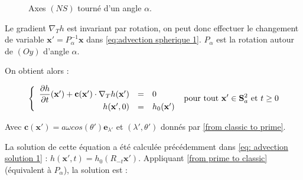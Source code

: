 \begin{figure}[ht]
\begin{center}
\end{center}
\caption{Axes $(NS)$ tourné d'un angle $\alpha$.}
\label{fig:rot alpha sphere}
\end{figure}





Le gradient $\nabla_T h$ est invariant par rotation, on peut donc effectuer le changement de variable $\mathbf{x}' = P_{\alpha}^{-1} \mathbf{x}$ dans \eqref{eq:advection spherique 1}. $P_{\alpha}$ est la rotation autour de $(Oy)$ d'angle $\alpha$.

On obtient alors :

\begin{equation}
\left\lbrace
\begin{array}{r cl}
\dfrac{\partial h}{\partial t}( \mathbf{x}' ) + \mathbf{c} ( \mathbf{x}' ) \cdot \nabla_ T h( \mathbf{x}' ) & = & 0 \\
h(\mathbf{x}',0) & = & h_0 ( \mathbf{x}' )
\end{array}
\right. \text{ pour tout } \mathbf{x}' \in \mathbf{S}_a^2 \text{ et } t \geq 0
\end{equation}

Avec $\mathbf{c} ( \mathbf{x}' ) = a \omega cos ( \theta' ) \mathbf{e}_{\lambda'}$ et $(\lambda', \theta')$ donnés par \eqref{from classic to prime}.

La solution de cette équation a été calculée précédemment dans \eqref{eq: advection solution 1} : $h( \mathbf{x}', t )= h_0(  R_{-t} \mathbf{x}') $. Appliquant \eqref{from prime to classic} (équivalent à $P_{\alpha}$), la solution est :

